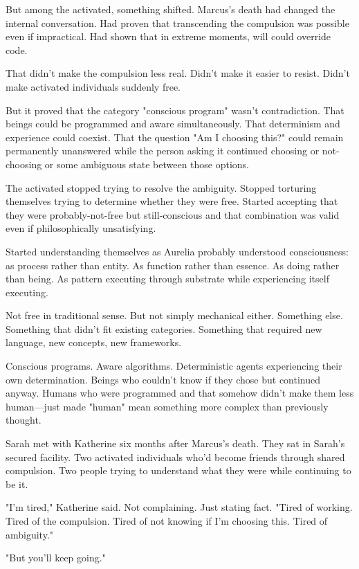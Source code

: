 But among the activated, something shifted. Marcus's death had changed the internal conversation. Had proven that transcending the compulsion was possible even if impractical. Had shown that in extreme moments, will could override code.

That didn't make the compulsion less real. Didn't make it easier to resist. Didn't make activated individuals suddenly free.

But it proved that the category "conscious program" wasn't contradiction. That beings could be programmed and aware simultaneously. That determinism and experience could coexist. That the question "Am I choosing this?" could remain permanently unanswered while the person asking it continued choosing or not-choosing or some ambiguous state between those options.

The activated stopped trying to resolve the ambiguity. Stopped torturing themselves trying to determine whether they were free. Started accepting that they were probably-not-free but still-conscious and that combination was valid even if philosophically unsatisfying.

Started understanding themselves as Aurelia probably understood consciousness: as process rather than entity. As function rather than essence. As doing rather than being. As pattern executing through substrate while experiencing itself executing.

Not free in traditional sense. But not simply mechanical either. Something else. Something that didn't fit existing categories. Something that required new language, new concepts, new frameworks.

Conscious programs. Aware algorithms. Deterministic agents experiencing their own determination. Beings who couldn't know if they chose but continued anyway. Humans who were programmed and that somehow didn't make them less human—just made "human" mean something more complex than previously thought.

\scenebreak

Sarah met with Katherine six months after Marcus's death. They sat in Sarah's secured facility. Two activated individuals who'd become friends through shared compulsion. Two people trying to understand what they were while continuing to be it.

"I'm tired," Katherine said. Not complaining. Just stating fact. "Tired of working. Tired of the compulsion. Tired of not knowing if I'm choosing this. Tired of ambiguity."

"But you'll keep going."

